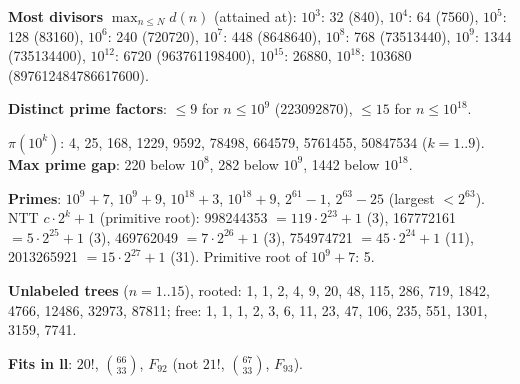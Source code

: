 	\textbf{Most divisors} $\max_{n \le N} d(n)$ (attained at): $10^3$: 32 (840), $10^4$: 64 (7560), $10^5$: 128 (83160),
	$10^6$: 240 (720720), $10^7$: 448 (8648640), $10^8$: 768 (73513440), $10^9$: 1344 (735134400),
	$10^{12}$: 6720 (963761198400), $10^{15}$: 26880, $10^{18}$: 103680 (897612484786617600).

	\textbf{Distinct prime factors}: $\le 9$ for $n \le 10^9$ (223092870), $\le 15$ for $n \le 10^{18}$.

	\textbf{$\pi(10^k)$}: 4, 25, 168, 1229, 9592, 78498, 664579, 5761455, 50847534 ($k = 1..9$).
	\textbf{Max prime gap}: 220 below $10^8$, 282 below $10^9$, 1442 below $10^{18}$.

	\textbf{Primes}: $10^9 + 7$, $10^9 + 9$, $10^{18} + 3$, $10^{18} + 9$, $2^{61} - 1$, $2^{63} - 25$ (largest $< 2^{63}$).
	NTT $c \cdot 2^k + 1$ (primitive root): 998244353 $= 119 \cdot 2^{23} + 1$ (3), 167772161 $= 5 \cdot 2^{25} + 1$ (3),
	469762049 $= 7 \cdot 2^{26} + 1$ (3), 754974721 $= 45 \cdot 2^{24} + 1$ (11), 2013265921 $= 15 \cdot 2^{27} + 1$ (31).
	Primitive root of $10^9 + 7$: 5.

	\textbf{Unlabeled trees} ($n = 1..15$), rooted: 1, 1, 2, 4, 9, 20, 48, 115, 286, 719, 1842, 4766, 12486, 32973, 87811;
	free: 1, 1, 1, 2, 3, 6, 11, 23, 47, 106, 235, 551, 1301, 3159, 7741.

	\textbf{Fits in ll}: $20!$, $\binom{66}{33}$, $F_{92}$ (not $21!$, $\binom{67}{33}$, $F_{93}$).

